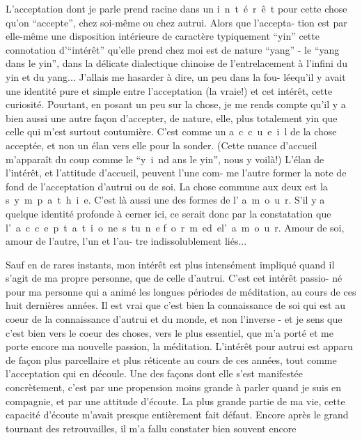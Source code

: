 L'acceptation dont je parle prend racine dans un \mbox{i n t é r ê t} pour
cette chose qu'on ``accepte'', chez soi-même ou chez autrui. Alors que l'accepta-\linebreak
tion est par elle-même une disposition intérieure de caractère typiquement ``yin''\unsure{;}
cette connotation d'``intérêt'' qu'elle prend chez moi est de nature ``yang'' - 
le ``yang dans le yin'', dans la délicate dialectique chinoise de l'entrelacement
à l'infini du yin et du yang... J'allais me hasarder à dire, un peu dans la fou-\linebreak
lée\inserted{,}qu'il y avait une identité pure et simple entre l'acceptation (la vraie!)
et cet intérêt, cette curiosité. Pourtant, en posant un peu sur la chose, je me
rends compte qu'il y a bien aussi une autre façon d'accepter, de nature, elle,
plus totalement yin que celle qui m'est surtout coutumière. C'est comme un
\mbox{a c c u e i l} de la chose acceptée, et non un élan vers elle pour la sonder.
(Cette nuance d'accueil m'apparaît du coup comme le ``\mbox{y i n}\quad d ans le yin'',
nous y voilà!) L'élan de l'intérêt, et l'attitude d'accueil, peuvent l'une com-\linebreak
me l'autre former la note de fond de l'acceptation d'autrui ou de soi. La chose
commune aux deux est la \mbox{s y m p a t h i e}. C'est là aussi une des formes de
l' \mbox{a m o u r}. S'il y a quelque identité profonde à cerner ici, ce serait
donc par la constatation que \mbox{l' a c c e p t a t i o n\quad e s t\quad u n e}
\mbox{f o r m e\quad d e\quad l' a m o u r}. Amour de soi, amour de l'autre, l'un et l'au-\linebreak
tre indissolublement liés...

Sauf en de rares instants, mon intérêt est plus intensément impliqué quand
il s'agit de ma propre personne, que de celle d'autrui. C'est cet intérêt passio-\linebreak
né pour ma personne qui a animé les longues périodes de méditation, au cours
de ces huit dernières années. Il est vrai que c'est bien la connaissance de soi
qui est au coeur de la connaissance d'autrui et du monde, et non l'inverse - et
je sens que c'est bien vers le coeur des choses, vers le plus essentiel, que
m'a porté et me porte encore ma nouvelle passion, la méditation. L'intérêt pour
autrui est apparu de façon plus parcellaire et plus réticente au cours de ces
années, tout comme l'acceptation qui en découle. Une des façons dont elle s'est
manifestée concrètement, c'est par une propension moins grande à parler quand je
suis en compagnie, et par une attitude d'écoute. La plus grande partie de ma vie,
cette capacité d'écoute m'avait presque entièrement fait défaut. Encore après
le grand tournant des retrouvailles, il m'a fallu constater bien souvent encore
\margin{\unsure{-}}

